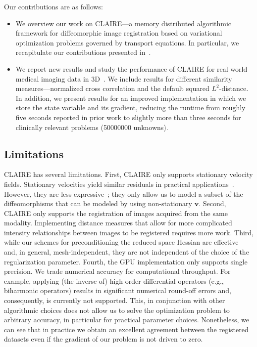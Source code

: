 \documentclass[11pt]{amsart}
\renewcommand{\vec}[1]{\ensuremath{\boldsymbol{#1}}}
\newcommand\inum[1]{\num[scientific-notation=fixed,round-precision=0,round-mode=places,group-separator = {,}]{#1}}
\begin{document}
Our contributions are as follows:
\begin{itemize}
\item We overview our work on CLAIRE---a memory distributed algorithmic framework for diffeomorphic image registration based on variational optimization problems governed by transport equations. In particular, we recapitulate our contributions presented in~\cite{Mang:2015a,Mang:2016a,Mang:2016b,Mang:2018a,Mang:2017b,Mang:2019a,Gholami:2017a,Brunn:2021b,Brunn:2020a,Brunn:2021a}.
\item We report new results and study the performance of CLAIRE for real world medical imaging data in 3D~\cite{Mang:2019a,claireweb,Brunn:2021b}. We include results for different similarity measures---normalized cross correlation and the default squared $L^2$-distance. In addition, we present results for an improved implementation in which we store the state variable and its gradient, reducing the runtime from roughly five seconds reported in prior work to slightly more than three seconds for clinically relevant problems (\inum{50000000} unknowns).
\end{itemize}




\subsection{Limitations}

CLAIRE has several limitations. First, CLAIRE only supports stationary velocity fields. Stationary velocities yield similar residuals in practical applications~\cite{Mang:2015a}. However, they are less expressive~\cite{Mang:2017a}; they only allow us to model a subset of the diffeomorphisms that can be modeled by using non-stationary $\vec{v}$. Second, CLAIRE only supports the registration of images acquired from the same modality. Implementing distance measures that allow for more complicated intensity relationships between images to be registered requires more work. Third, while our schemes for preconditioning the reduced space Hessian are effective and, in general, mesh-independent, they are not independent of the choice of the regularization parameter. Fourth, the GPU implementation only supports single precision. We trade numerical accuracy for computational throughput. For example, applying (the inverse of) high-order differential operators (e.g., biharmonic operators) results in significant numerical round-off errors and, consequently, is currently not supported. This, in conjunction with other algorithmic choices does not allow us to solve the optimization problem to arbitrary accuracy, in particular for practical parameter choices. Nonetheless, we can see that in practice we obtain an excellent agreement between the registered datasets even if the gradient of our problem is not driven to zero.
\end{document}
